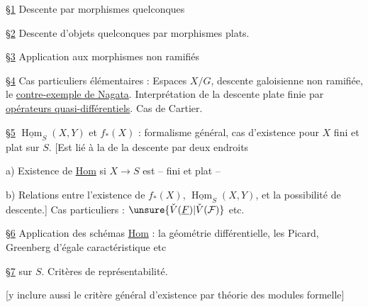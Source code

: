 
\uline{\S1} Descente  par morphismes quelconques

\uline{\S2} Descente d'objets quelconques par morphismes plats.

\uline{\S3} Application  aux morphismes non ramifiés

\uline{\S4} Cas particuliers élémentaires : Espaces $X/G$, descente galoisienne non ramifiée, le \uline{contre-exemple de Nagata}. Interprétation de la descente plate finie par \uline{opérateurs quasi-différentiels}. Cas de Cartier.

\uline{\S5} $\underline{\operatorname{Hom}}_S(X,Y)$ et $f_*(X)$ : formalisme général, cas d'existence pour $X$ fini et plat sur $S$. [Est lié à la  de la descente  par deux endroits

a) Existence de \uline{Hom} si $X\to S$ est  -- fini et plat --

b) Relations entre l'existence de $f_*(X)$, $\underline{\operatorname{Hom}}_S(X,Y)$, et la possibilité de descente.] Cas particuliers : $\unsure{\check V(\underline F)|\check V(\mathcal F)}$ etc.

\uline{\S6} Application des schémas \uline{Hom} : la géométrie différentielle, les Picard, Greenberg d'égale caractéristique etc

\uline{\S7}  sur $S$. Critères de représentabilité.

[y inclure aussi le critère général d'existence par théorie des modules formelle]

